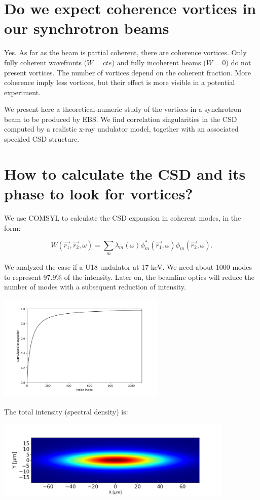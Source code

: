 \documentclass[a4paper,10pt]{article}
\begin{document}
\section{Do we expect coherence vortices in our synchrotron beams}

Yes. As far as the beam is partial coherent, there are coherence vortices. Only fully coherent wavefronts ($W=cte$) and fully incoherent beams ($W=0$) do not present vortices. The number of vortices depend on the coherent fraction. More coherence imply less vortices, but their effect is more visible in a potential experiment. 

We present here a theoretical-numeric study  of the vortices in a synchrotron beam to be produced by EBS. We find correlation singularities in the CSD computed by a realistic x-ray undulator model, together with an associated speckled CSD structure.


\section{How to calculate the CSD and its phase to look for vortices?}

We use COMSYL to calculate the CSD expansion  in coherent modes, in the form:


\begin{equation}
W(\vec{r_1}, \vec{r_2}, \omega)
=
\sum_m
\lambda_m(\omega)
\phi_m^*(\vec{r_1},\omega)
\phi_m(\vec{r_2}, \omega).
\end{equation}

We analyzed the case if a U18 undulator at 17 keV. We need about 1000 modes to represent 97.9\% of the intensity. Later on, the beamline optics will reduce the number of modes  with a subsequent reduction of intensity. 

\includegraphics[width=0.6\textwidth]{Figures/vx_cumulated.png}

The total intensity (spectral density) is: 

\includegraphics[width=0.85\textwidth]{Figures/spectral_density_upto1099.png}
\end{document}
